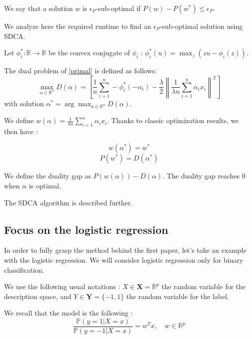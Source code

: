 \documentclass{article}
\newcommand{\norm}[1]{\left\|#1 \right\|}
\begin{document}
We say that a solution $w$ is $\epsilon_P$-sub-optimal if $P(w) - P(w^{*}) \leq \epsilon_P$.

We analyze here the required runtime to find an $\epsilon_P$-sub-optimal solution using SDCA.

Let $\phi_i^{*} : \mathbb{R} \rightarrow \mathbb{R}$ be the convex conjugate of $\phi_i$ : $\phi_i^{*}(u) = \max_z (zu-\phi_i(z))$.

The dual problem of \eqref{primal} is defined as follows:
\begin{equation}
    \max_{\alpha \in \mathbb{R}^n} D(\alpha) = \left[ \dfrac{1}{n} \sum_{i=1}^n -\phi_i^{*}(-\alpha_i) - \dfrac{\lambda}{2}\norm{\dfrac{1}{\lambda n}\sum_{i=1}^n \alpha_ix_i}^2 \right]
    \label{dual}
\end{equation}
with solution $\alpha^{*} = \arg \max_{a \in \mathbb{R}^n} D(\alpha)$.

We define $w(\alpha) = \frac{1}{\lambda n} \sum_{i=1}^n \alpha_ix_i$.
Thanks to classic optimization results, we then have :

\begin{equation}
	w(\alpha^{*}) = w^{*}
\end{equation}
\begin{equation}
	P(w^{*}) = D(\alpha^{*})
\end{equation}

We define the duality gap as $P(w(\alpha)) - D(\alpha)$.
The duality gap reaches 0 when $\alpha$ is optimal.

The SDCA algorithm is described further.

\subsection{Focus on the logistic regression}

In order to fully grasp the method behind the first paper, let's take an example with the logistic regression.
We will consider logistic regression only for binary classification.

We use the following usual notations : $X \in \mathbf{X} = \mathbb{R}^p$ the random variable for the description space, and $Y \in \mathbf{Y} = \{-1,1\}$ the random variable for the label.

We recall that the model is the following :
\begin{equation}
	\frac{\mathbb{P}(y=1 | X=x)}{\mathbb{P}(y=-1 |X=x)} = w^T x, \quad w \in \mathbb{R}^p
\end{equation}
\end{document}
